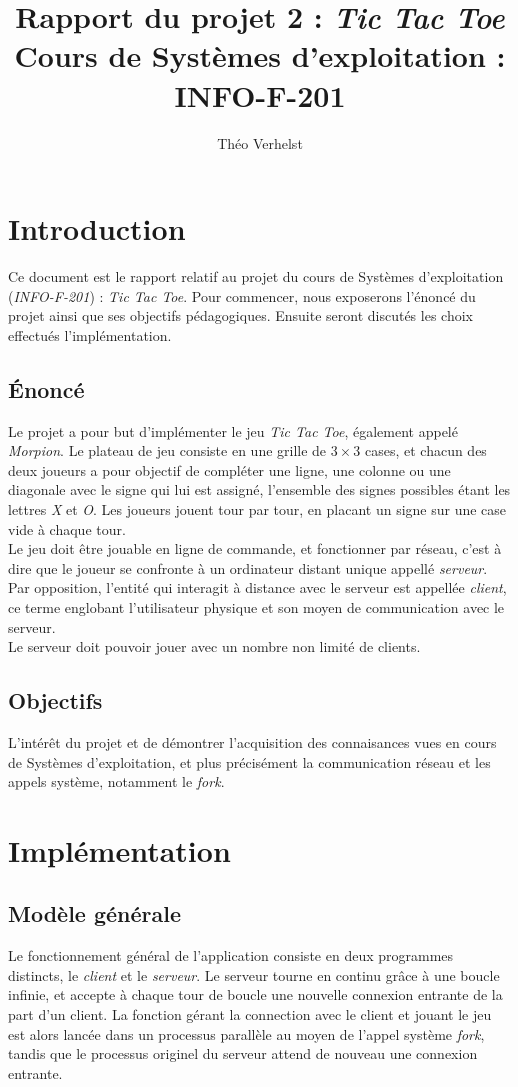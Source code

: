 \documentclass[a4paper]{article}
\author{Théo Verhelst}
\title{Rapport du projet 2 : \textit{Tic Tac Toe}\\Cours de Systèmes d'exploitation : INFO-F-201}
\begin{document}
\maketitle
\section{Introduction}
Ce document est le rapport relatif au projet du cours de Systèmes d'exploitation (\textit{INFO-F-201}) : \textit{Tic Tac Toe}.
Pour commencer, nous exposerons l'énoncé du projet ainsi que ses objectifs pédagogiques.
Ensuite seront discutés les choix effectués l'implémentation.
\subsection{Énoncé}
Le projet a pour but d'implémenter le jeu \textit{Tic Tac Toe}, également appelé \textit{Morpion}.
Le plateau de jeu consiste en une grille de $3\times3$ cases, et chacun des deux joueurs a pour objectif
de compléter une ligne, une colonne ou une diagonale avec le signe qui lui est assigné, l'ensemble des signes possibles
étant les lettres \textit{X} et \textit{O}.
Les joueurs jouent tour par tour, en placant un signe sur une case vide à chaque tour.\\
Le jeu doit être jouable en ligne de commande, et fonctionner par réseau, c'est à dire que
le joueur se confronte à un ordinateur distant unique appellé \textit{serveur}.
Par opposition, l'entité qui interagit à distance avec le serveur est appellée \textit{client}, ce terme
englobant l'utilisateur physique et son moyen de communication avec le serveur.\\
Le serveur doit pouvoir jouer avec un nombre non limité de clients.
\subsection{Objectifs}
L'intérêt du projet et de démontrer l'acquisition des connaisances vues en cours de Systèmes d'exploitation,
et plus précisément la communication réseau et les appels système, notamment le \textit{fork}.

\section{Implémentation}
\subsection{Modèle générale}
Le fonctionnement général de l'application consiste en deux programmes distincts, le \textit{client} et le \textit{serveur}.
Le serveur tourne en continu grâce à une boucle infinie, et accepte à chaque tour de boucle une nouvelle connexion entrante de la
part d'un client. La fonction gérant la connection avec le client et jouant le jeu est alors lancée dans un processus parallèle
au moyen de l'appel système \textit{fork}, tandis que le processus originel du serveur attend de nouveau une connexion entrante.
\end{document}
